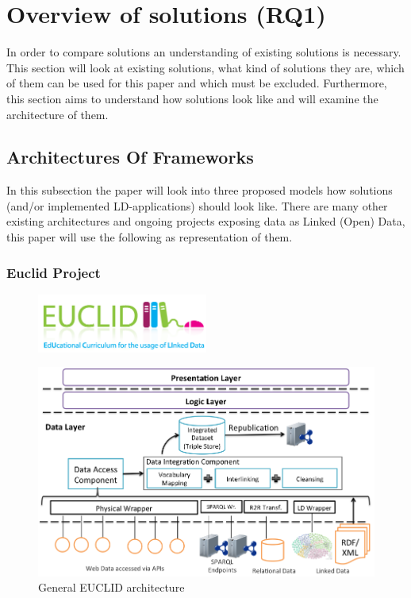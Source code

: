 \chapter{Overview of solutions (RQ1)}\label{overview}
In order to compare solutions an understanding of existing solutions is necessary. This section will look at existing solutions, what kind of solutions they are, which of them can be used for this paper and which must be excluded. Furthermore, this section aims to understand how solutions look like and will examine the architecture of them.

\section{Architectures Of Frameworks}\label{arch_frameworks}
In this subsection the paper will look into three proposed models how solutions (and/or implemented LD-applications) should look like. There are many other existing architectures and ongoing projects exposing data as Linked (Open) Data, this paper will use the following as representation of them.

\subsection{Euclid Project}

\begin{figure}[h]
	\centering
\includegraphics[width=0.5\textwidth]{img/euclid_logo.png}
\end{figure}

\begin{figure}[htbp]
	\centering
\includegraphics[width=.8\textwidth]{img/euclid_architecture.png}
	\caption{General EUCLID architecture}
	\label{euclid_architecture}
\end{figure}

